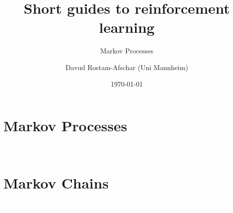 \documentclass[11pt,table]{beamer}
\title[]{Short guides to reinforcement learning}
\subtitle[]{Markov Processes}
\author[D. Rostam-Afschar]{\textcolor{gray1}{Davud Rostam-Afschar (Uni Mannheim)}}
\date[]{\today}
\begin{document}
\begin{frame}[plain]
  \titlepage
\end{frame}


\section{Markov Processes}
{
\begin{frame}
\centering
\Huge
\textcolor{white}{How to predict transitions?}
\thispagestyle{empty}
\end{frame}
}


\section{Markov Chains}
{
\begin{frame}
\centering
\Huge
\textcolor{white}{Markov Chains}
\thispagestyle{empty}
\end{frame}
}
\end{document}
